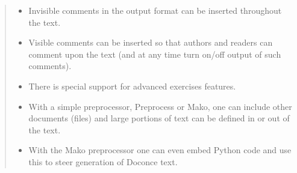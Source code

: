 \documentclass[a4paper]{article}
\begin{document}
\begin{quote}
\begin{itemize}
\item Invisible comments in the output format can be inserted throughout
the text.

\item Visible comments can be inserted so that authors and readers can
comment upon the text (and at any time turn on/off output of such
comments).

\item There is special support for advanced exercises features.

\item With a simple preprocessor, Preprocess or Mako, one can include
other documents (files) and large portions of text can be defined
in or out of the text.

\item With the Mako preprocessor one can even embed Python
code and use this to steer generation of Doconce text.

\end{itemize}

\end{quote}
\end{document}
